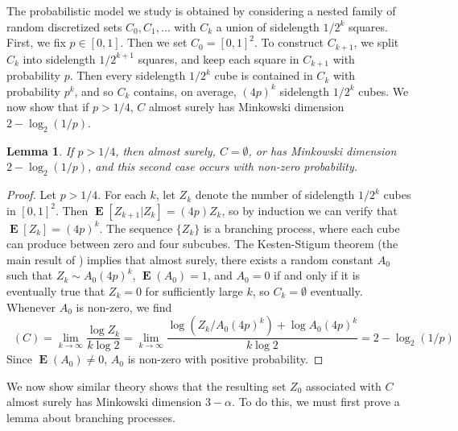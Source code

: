 \documentclass[dvipsnames,letterpaper,12pt]{article}
\numberwithin{equation}{section}
\theoremstyle{plain}
\newtheorem{lemma}{Lemma}
\DeclareMathOperator{\minkdim}{\dim_{\mathbf{M}}}
\DeclareMathOperator{\Expect}{\mathbf{E}}
\begin{document}
The probabilistic model we study is obtained by considering a nested family of random discretized sets $C_0,C_1, \dots$ with $C_k$ a union of sidelength $1/2^k$ squares. First, we fix $p \in [0,1]$. Then we set $C_0 = [0,1]^2$. To construct $C_{k+1}$, we split $C_k$ into sidelength $1/2^{k+1}$ squares, and keep each square in $C_{k+1}$ with probability $p$. Then every sidelength $1/2^k$ cube is contained in $C_k$ with probability $p^k$, and so $C_k$ contains, on average, $(4p)^k$ sidelength $1/2^k$ cubes. We now show that if $p > 1/4$, $C$ almost surely has Minkowski dimension $2 - \log_2(1/p)$.

\begin{lemma} \label{randomdimension}
	If $p > 1/4$, then almost surely, $C = \emptyset$, or has Minkowski dimension $2 - \log_2(1/p)$, and this second case occurs with non-zero probability.%
\end{lemma}
\begin{proof}
	Let $p > 1/4$. For each $k$, let $Z_k$ denote the number of sidelength $1/2^k$ cubes in $[0,1]^2$. Then $\Expect[Z_{k+1}|Z_k] = (4p) Z_k$, so by induction we can verify that $\Expect[Z_k] = (4p)^k$. The sequence $\{ Z_k \}$ is a branching process, where each cube can produce between zero and four subcubes. The Kesten-Stigum theorem (the main result of \cite{KestenStigum}) implies that almost surely, there exists a random constant $A_0$ such that $Z_k \sim A_0 (4p)^k$, $\Expect(A_0) = 1$, and $A_0 = 0$ if and only if it is eventually true that $Z_k = 0$ for sufficiently large $k$, so $C_k = \emptyset$ eventually. Whenever $A_0$ is non-zero, we find
	\[ \minkdim(C) = \lim_{k \to \infty} \frac{\log Z_k}{k \log 2} = \lim_{k \to \infty} \frac{\log(Z_k/A_0 (4p)^k) + \log A_0 (4p)^k}{k \log 2} = 2 - \log_2(1/p) \]
	Since $\Expect(A_0) \neq 0$, $A_0$ is non-zero with positive probability. %
\end{proof}

We now show similar theory shows that the resulting set $Z_0$ associated with $C$ almost surely has Minkowski dimension $3 - \alpha$. To do this, we must first prove a lemma about branching processes.
\end{document}

